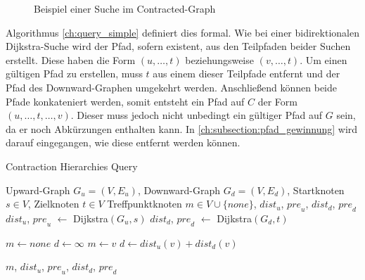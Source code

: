 \begin{figure}[ht]
  \centering
  \caption{Beispiel einer Suche im Contracted-Graph}
  \label{fig:ch:beispiel_suche}
\end{figure}

Algorithmus \ref{ch:query_simple} definiert dies formal.
Wie bei einer bidirektionalen Dijkstra-Suche wird der Pfad, sofern existent, aus den Teilpfaden beider Suchen erstellt.
Diese haben die Form $(u, \dotsc, t)$ beziehungsweise $(v, \dotsc, t)$.
Um einen gültigen Pfad zu erstellen, muss $t$ aus einem dieser Teilpfade entfernt und der Pfad des Downward-Graphen umgekehrt werden.
Anschließend können beide Pfade konkateniert werden, somit entsteht ein Pfad auf $C$ der Form $(u, \dotsc, t, \dotsc, v)$.
Dieser muss jedoch nicht unbedingt ein gültiger Pfad auf $G$ sein, da er noch Abkürzungen enthalten kann.
In \autoref{ch:subsection:pfad_gewinnung} wird darauf eingegangen, wie diese entfernt werden können.

\begin{algorithm}[ht]
  \caption{Contraction Hierarchies Query}
  \begin{algorithmic}[1]
    \Require Upward-Graph $G_u = (V, E_u)$, Downward-Graph $G_d = (V, E_d)$, Startknoten $s \in V$, Zielknoten $t \in V$
    \Ensure Treffpunktknoten $m \in V \cup \{ {none} \}$, ${dist}_u$, ${pre}_u$, ${dist}_d$, ${pre}_d$
    \State ${dist}_u$, ${pre}_u$ $\leftarrow$ Dijkstra$(G_u, s)$
    \State ${dist}_d$, ${pre}_d$ $\leftarrow$ Dijkstra$(G_d, t)$

    \State
    \State $m \leftarrow {none}$
    \State $d \leftarrow \infty$
    \State
    \State $m \leftarrow v$
    \State $d \leftarrow {dist}_u(v) + {dist}_d(v)$
    \EndIf
    \EndFor

    \State
    \State \Return $m$, ${dist}_u$, ${pre}_u$, ${dist}_d$, ${pre}_d$
  \end{algorithmic}
  \label{ch:query_simple}
\end{algorithm}

